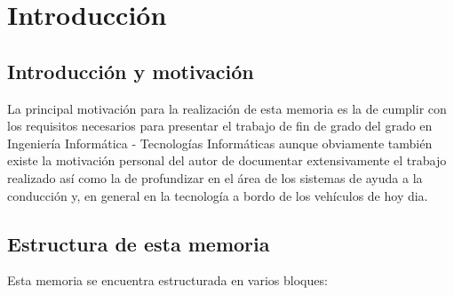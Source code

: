 \chapter{Introducción}\label{capIntroduccion}

\section{Introducción y motivación}\label{sec:intro}


La principal motivación para la realización de esta memoria es la de cumplir con los requisitos necesarios para presentar el trabajo de fin de grado del grado en Ingeniería Informática - Tecnologías Informáticas aunque obviamente también existe la motivación personal del autor de documentar extensivamente el trabajo realizado así como la de profundizar en el área de los sistemas de ayuda a la conducción y, en general en la tecnología a bordo de los vehículos de hoy dia.


\section{Estructura de esta memoria} \label{sec:estructuramemoria}
Esta memoria se encuentra estructurada en varios bloques:

